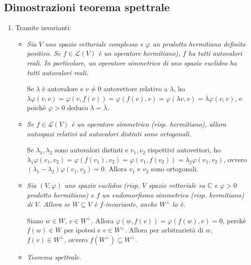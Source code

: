 \documentclass[a4paper,11pt]{article}
\begin{document}
\subsection{Dimostrazioni teorema spettrale}
\begin{enumerate}
	\item Tramite invarianti:
	\begin{itemize}
		\item \textit{Sia $V$ uno spazio vettoriale complesso e $\varphi$ un prodotto hermitiano definito positivo. Se $f\in\mathcal{L}(V)$ è un operatore hermitiano), $f$ ha tutti autovalori reali. In particolare, un operatore simmetrico di uno spazio euclideo ha tutti autovalori reali.} 
		
		\noindent Se $\lambda$ è autovalore e $v\neq 0$ autovettore relativo a $\lambda$, ho $\lambda\varphi(v,v)=\varphi(v,f(v))=\varphi(f(v),v)=\varphi(\lambda v,v)=\overline{\lambda}\varphi(v,v)$, e poichè $\varphi>0$ deduco $\lambda=\overline{\lambda}$.
		\item \textit{Se $f\in\mathcal{L}(V)$ è un operatore simmetrico (risp. hermitiano), allora autospazi relativi ad autovalori distinti sono ortogonali.} 
		
		\noindent Se $\lambda_1,\lambda_2$ sono autovalori distinti e $v_1,v_2$ rispettivi autovettori, ho $\lambda_1\varphi(v_1,v_2)=\varphi(f(v_1),v_2)=\varphi(v_1,f(v_2))=\lambda_2\varphi(v_1,v_2)$, ovvero $(\lambda_1-\lambda_2)\varphi(v_1,v_2)=0$. Allora $v_1$ e $v_2$ sono ortogonali.
		\item\textit{Sia $(V,\varphi)$ uno spazio euclideo (risp, $V$ spazio vettoriale su $\mathbb{C}$ e $\varphi>0$ prodotto hermitiano) e $f$ un endomorfismo simmetrico (risp. hermitiano) di $V$. Allora se $W\subseteq V$ è $f$-invariante, anche $W^{\perp}$ lo è.}
		
		\noindent Siano $w\in W$, $v\in W^\perp$. Allora $\varphi(w,f(v))=\varphi(f(w),v)=0$, perchè $f(w)\in W$ per ipotesi e $v\in W^\perp$. Allora per arbitrarietà di $w$, $f(v)\in W^\perp$, ovvero $f(W^\perp)\subseteq W^\perp$.
		\item \textit{Teorema spettrale.} 
		

\end{itemize}
\end{enumerate}
\end{document}
